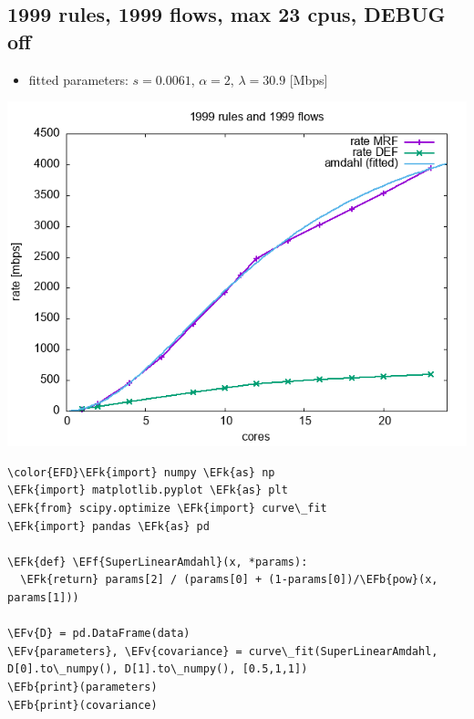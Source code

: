 \documentclass[11pt]{article}
\newcommand{\EFk}[1]{\textcolor{EFk}{#1}} %
\newcommand{\EFb}[1]{\textcolor{EFb}{#1}} %
\newcommand{\EFf}[1]{\textcolor{EFf}{#1}} %
\newcommand{\EFv}[1]{\textcolor{EFv}{#1}} %
\begin{document}
\subsection*{1999 rules, 1999 flows, max 23 cpus, DEBUG off}
\label{sec:org54c7199}
\begin{itemize}
\item fitted parameters: \(s=0.0061\), \(\alpha=2\), \(\lambda=30.9\) [Mbps]
\end{itemize}
\begin{center}
\includegraphics[width=.9\linewidth]{plot-1999rules-1999flows-2.png}
\end{center}

\begin{Code}
\begin{Verbatim}
\color{EFD}\EFk{import} numpy \EFk{as} np
\EFk{import} matplotlib.pyplot \EFk{as} plt
\EFk{from} scipy.optimize \EFk{import} curve\_fit
\EFk{import} pandas \EFk{as} pd

\EFk{def} \EFf{SuperLinearAmdahl}(x, *params):
  \EFk{return} params[2] / (params[0] + (1-params[0])/\EFb{pow}(x, params[1]))

\EFv{D} = pd.DataFrame(data)
\EFv{parameters}, \EFv{covariance} = curve\_fit(SuperLinearAmdahl, D[0].to\_numpy(), D[1].to\_numpy(), [0.5,1,1])
\EFb{print}(parameters)
\EFb{print}(covariance)
\end{Verbatim}
\end{Code}
\end{document}

